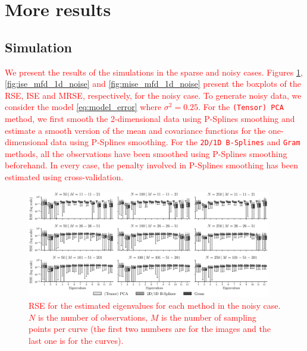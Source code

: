 \section{More results} %
\label{sec:more_results}


\subsection{Simulation} %
\label{sub:simulation}

\textcolor{red}{We present the results of the simulations in the sparse and noisy cases. Figures \ref{fig:logAE_mfd_1d_noise}, \ref{fig:ise_mfd_1d_noise} and \ref{fig:mise_mfd_1d_noise} present the boxplots of the RSE, ISE and MRSE, respectively, for the noisy case. To generate noisy data, we consider the model \eqref{eq:model_error} where $\sigma^2 = 0.25$. For the \texttt{(Tensor) PCA} method, we first smooth the 2-dimensional data using P-Splines smoothing and estimate a smooth version of the mean and covariance functions for the one-dimensional data using P-Splines smoothing. For the \texttt{2D/1D B-Splines} and \texttt{Gram} methods, all the observations have been smoothed using P-Splines smoothing beforehand. In every case, the penalty involved in P-Splines smoothing has been estimated using cross-validation.}

\begin{figure}
    \centering
    \includegraphics[width=0.95\textwidth]{figures/AE_noise.eps}
    \caption{\textcolor{red}{RSE for the estimated eigenvalues for each method in the noisy case. $N$ is the number of observations, $M$ is the number of sampling points per curve (the first two numbers are for the images and the last one is for the curves).}}
    \label{fig:logAE_mfd_1d_noise}
\end{figure}

